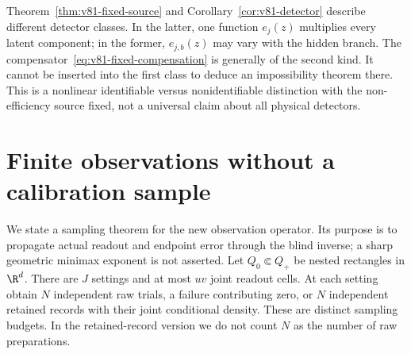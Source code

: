 Theorem~\ref{thm:v81-fixed-source} and
Corollary~\ref{cor:v81-detector} describe different detector classes.
In the latter, one function $e_j(z)$ multiplies every latent component;
in the former, $e_{j,b}(z)$ may vary with the hidden branch.  The
compensator~\eqref{eq:v81-fixed-compensation} is generally of the second
kind.  It cannot be inserted into the first class to deduce an
impossibility theorem there.  This is a nonlinear identifiable versus
nonidentifiable distinction with the non-efficiency source fixed,
not a universal claim about all physical detectors.

\section{Finite observations without a calibration sample}
\label{sec:v81-statistics}

We state a sampling theorem for the new observation operator.  Its
purpose is to propagate actual readout and endpoint error through the
blind inverse; a sharp geometric minimax exponent is not asserted.
Let $Q_0\Subset Q_+$ be nested rectangles in $\R^d$.  There are $J$
settings and at most $uv$ joint readout cells.  At each setting obtain
$N$ independent raw trials, a failure contributing zero, or $N$
independent retained records with their joint conditional density.
These are distinct sampling budgets.  In the retained-record version
we do not count $N$ as the number of raw preparations.

